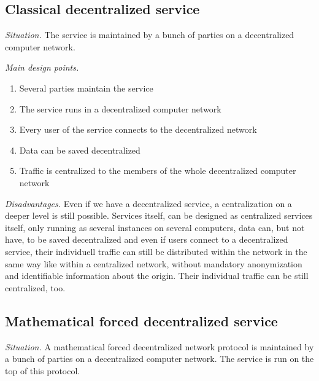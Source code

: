 \documentclass[12pt]{../document-templates/papers/one-column-mydashie/mydashie}
\newtheorem*{theorem A}{Theorem A}
\newtheorem*{theorem B}{N\"olker's Theorem}
\theoremstyle{remark}
\theoremstyle{remark}
\begin{document}
\subsection{Classical decentralized service}
\label{ss:classicaldecentralizedservice}
\textit{Situation.} The service is maintained by a bunch of parties on a decentralized computer network.

\vspace{0.3cm}
\textit{Main design points.}
\begin{enumerate}
	\item Several parties maintain the service
	\item The service runs in a decentralized computer network
	\item Every user of the service connects to the decentralized network
	\item Data can be saved decentralized
	\item Traffic is centralized to the members of the whole decentralized computer network
\end{enumerate}

\vspace{0.3cm}
\textit{Disadvantages.} Even if we have a decentralized service, a centralization on a deeper level is still possible. Services itself, can be designed as centralized services itself, only running as several instances on several computers, data can, but not have, to be saved decentralized and even if users connect to a decentralized service, their individuell traffic can still be distributed within the network in the same way like within a centralized network, without mandatory anonymization and identifiable information about the origin. Their individual traffic can be still centralized, too.
\subsection{Mathematical forced decentralized service}
\label{ss:mathematicalforceddecentralizedservice}
\textit{Situation.} A mathematical forced decentralized network protocol is maintained by a bunch of parties on a decentralized computer network. The service is run on the top of this protocol.
\end{document}
